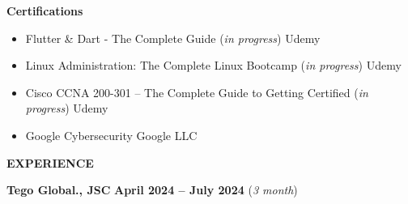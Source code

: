 \documentclass[a4paper,10pt]{article}
\begin{document}
\vspace{6pt}

\textbf{Certifications}
\begin{itemize} [noitemsep, topsep=0pt, partopsep=0pt, parsep=0pt]
    \item Flutter \& Dart - The Complete Guide (\textit{in progress})	\hfill Udemy
    \item Linux Administration: The Complete Linux Bootcamp (\textit{in progress})	\hfill Udemy
    \item Cisco CCNA 200-301 – The Complete Guide to Getting Certified (\textit{in progress}) \hfill Udemy
    \item Google Cybersecurity 	\hfill Google LLC
\end{itemize}

\vspace{10pt}

\begin{center}
    \textbf{EXPERIENCE} \hrulefill
\end{center}
\textbf{Tego Global., JSC} \hfill \textbf{April 2024 – July 2024} (\textit{3 month})
\end{document}
